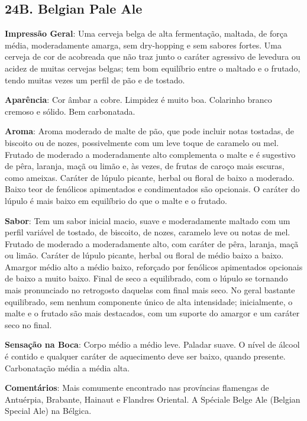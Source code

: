 \subsection*{24B. Belgian Pale Ale}

\textbf{Impressão Geral}: Uma cerveja belga de alta fermentação, maltada, de força média, moderadamente amarga, sem dry-hopping e sem sabores fortes. Uma cerveja de cor de acobreada que não traz junto o caráter agressivo de levedura ou acidez de muitas cervejas belgas; tem bom equilíbrio entre o maltado e o frutado, tendo muitas vezes um perfil de pão e de tostado.

\textbf{Aparência}: Cor âmbar a cobre. Limpidez é muito boa. Colarinho branco cremoso e sólido. Bem carbonatada.

\textbf{Aroma}: Aroma moderado de malte de pão, que pode incluir notas tostadas, de biscoito ou de nozes, possivelmente com um leve toque de caramelo ou mel. Frutado de moderado a moderadamente alto complementa o malte e é sugestivo de pêra, laranja, maçã ou limão e, às vezes, de frutas de caroço mais escuras, como ameixas. Caráter de lúpulo picante, herbal ou floral de baixo a moderado. Baixo teor de fenólicos apimentados e condimentados são opcionais. O caráter do lúpulo é mais baixo em equilíbrio do que o malte e o frutado.

\textbf{Sabor}: Tem um sabor inicial macio, suave e moderadamente maltado com um perfil variável de tostado, de biscoito, de nozes, caramelo leve ou notas de mel. Frutado de moderado a moderadamente alto, com caráter de pêra, laranja, maçã ou limão. Caráter de lúpulo picante, herbal ou floral de médio baixo a baixo. Amargor médio alto a médio baixo, reforçado por fenólicos apimentados opcionais de baixo a muito baixo. Final de seco a equilibrado, com o lúpulo se tornando mais pronunciado no retrogosto daquelas com final mais seco. No geral bastante equilibrado, sem nenhum componente único de alta intensidade; inicialmente, o malte e o frutado são mais destacados, com um suporte do amargor e um caráter seco no final.

\textbf{Sensação na Boca}: Corpo médio a médio leve. Paladar suave. O nível de álcool é contido e qualquer caráter de aquecimento deve ser baixo, quando presente. Carbonatação média a média alta.

\textbf{Comentários}: Mais comumente encontrado nas províncias flamengas de Antuérpia, Brabante, Hainaut e Flandres Oriental. A Spéciale Belge Ale (Belgian Special Ale) na Bélgica.

